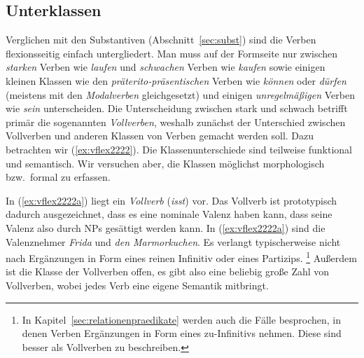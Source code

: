 \subsection{Unterklassen}

\label{sec:vunterklass}


Verglichen mit den Substantiven (Abschnitt~\ref{sec:subst}) sind die Verben flexionsseitig einfach untergliedert.
Man muss auf der Formseite nur zwischen \textit{starken} Verben wie \textit{laufen} und \textit{schwachen} Verben wie \textit{kaufen} sowie einigen kleinen Klassen wie den \textit{präterito-präsentischen} Verben wie \textit{können} oder \textit{dürfen} (meistens mit den \textit{Modalverben} gleichgesetzt) und einigen \textit{unregelmäßigen} Verben wie \textit{sein} unterscheiden.
Die Unterscheidung zwischen stark und schwach betrifft primär die sogenannten \textit{Vollverben}, weshalb zunächst der Unterschied zwischen Vollverben und anderen Klassen von Verben gemacht werden soll.
Dazu betrachten wir (\ref{ex:vflex2222}).
Die Klassenunterschiede sind teilweise funktional und semantisch.
Wir versuchen aber, die Klassen möglichst morphologisch bzw.\ formal zu erfassen.

\begin{exe}
  \ex\label{ex:vflex2222}
  \begin{xlist}
  \end{xlist}
\end{exe}

In (\ref{ex:vflex2222a}) liegt ein \textit{Vollverb} (\textit{isst}) vor.
Das Vollverb ist prototypisch dadurch ausgezeichnet, dass es eine nominale Valenz haben kann, dass seine Valenz also durch NPs gesättigt werden kann.
In (\ref{ex:vflex2222a}) sind die Valenznehmer \textit{Frida} und \textit{den Marmorkuchen}.
Es verlangt typischerweise nicht nach Ergänzungen in Form eines reinen Infinitiv oder eines Partizips.%
\footnote{In Kapitel~\ref{sec:relationenpraedikate} werden auch die Fälle besprochen, in denen Verben Ergänzungen in Form eines zu-Infinitivs nehmen.
Diese sind besser als Vollverben zu beschreiben.}
Außerdem ist die Klasse der Vollverben offen, es gibt also eine beliebig große Zahl von Vollverben, wobei jedes Verb eine eigene Semantik mitbringt.

